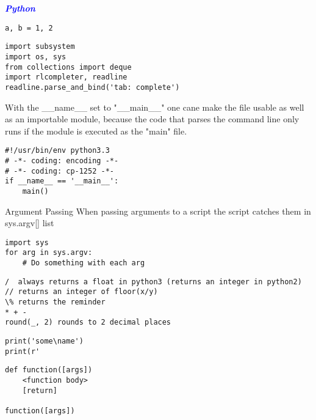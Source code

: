 \documentclass[9pt]{amsart}
\newcommand{\filldots}{\noindent \textbf {\textcolor {blue} {\dotfill}} }
\begin{document}
\begin{multicols}{2}
\filldots 

\noindent \textbf {\textcolor {blue} {\em Python}} 

\noindent {\textcolor {blue} {\em Variables}}   
\begin{lstlisting}
a, b = 1, 2
\end{lstlisting}

\noindent {\textcolor {blue} {\em Imports}} 

\begin{lstlisting}
import subsystem
import os, sys
from collections import deque
import rlcompleter, readline
readline.parse_and_bind('tab: complete')
\end{lstlisting}

\noindent {\textcolor {blue} {\em Env \& Progs}}
With the \_\_name\_\_ set to "\_\_main\_\_" one cane make the file usable as well as an importable module, because the code that parses the command line only runs if the module is executed as the "main" file.
\begin{lstlisting}
#!/usr/bin/env python3.3
# -*- coding: encoding -*-
# -*- coding: cp-1252 -*-
if __name__ == '__main__':
	main()
\end{lstlisting}
Argument Passing 
When passing arguments to a script the script catches them in sys.argv[] list 
\begin{lstlisting}
import sys
for arg in sys.argv:
	# Do something with each arg
\end{lstlisting}

\noindent {\textcolor {blue} {\em Arithmetic operations}} 
\begin{lstlisting}
/  always returns a float in python3 (returns an integer in python2)
// returns an integer of floor(x/y)
\% returns the reminder
* + -
round(_, 2) rounds to 2 decimal places
\end{lstlisting}

\noindent {\textcolor {blue} {\em Strings}} 
\begin{lstlisting}
print('some\name')
print(r'
\end{lstlisting}

\noindent {\textcolor {blue} {\em Variable scopes}} 

\noindent {\textcolor {blue} {\em Functions}}  

\begin{lstlisting}
def	function([args])
	<function body>
	[return]

function([args])
\end{lstlisting}


\end{multicols}
\end{document}
